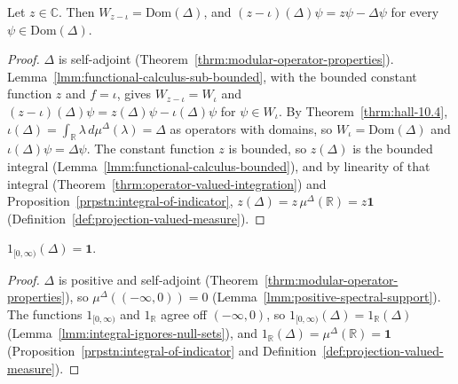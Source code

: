 \begin{lemma}
    \label{lmm:modular-z-minus-fc}
    \leanok
    Let $z \in \mathbb{C}$. Then $W_{z - \iota} = \text{Dom}(\Delta)$, and $(z - \iota)(\Delta)\psi = z\psi - \Delta\psi$ for every $\psi \in \text{Dom}(\Delta)$.
\end{lemma}
\begin{proof}
    \leanok
    $\Delta$ is self-adjoint (Theorem~\ref{thrm:modular-operator-properties}). Lemma~\ref{lmm:functional-calculus-sub-bounded}, with the bounded constant function $z$ and $f = \iota$, gives $W_{z - \iota} = W_\iota$ and $(z - \iota)(\Delta)\psi = z(\Delta)\psi - \iota(\Delta)\psi$ for $\psi \in W_\iota$. By Theorem~\ref{thrm:hall-10.4}, $\iota(\Delta) = \int_{\mathbb{R}} \lambda \, d\mu^\Delta(\lambda) = \Delta$ as operators with domains, so $W_\iota = \text{Dom}(\Delta)$ and $\iota(\Delta)\psi = \Delta\psi$. The constant function $z$ is bounded, so $z(\Delta)$ is the bounded integral (Lemma~\ref{lmm:functional-calculus-bounded}), and by linearity of that integral (Theorem~\ref{thrm:operator-valued-integration}) and Proposition~\ref{prpstn:integral-of-indicator}, $z(\Delta) = z\,\mu^\Delta(\mathbb{R}) = z\mathbf{1}$ (Definition~\ref{def:projection-valued-measure}).
\end{proof}

\begin{lemma}[$1_{[0, \infty)}(\Delta) = \mathbf{1}$]
    \label{lmm:modular-indicator-nonneg-one}
    \leanok
    $1_{[0, \infty)}(\Delta) = \mathbf{1}$.
\end{lemma}
\begin{proof}
    \leanok
    $\Delta$ is positive and self-adjoint (Theorem~\ref{thrm:modular-operator-properties}), so $\mu^\Delta((-\infty, 0)) = 0$ (Lemma~\ref{lmm:positive-spectral-support}). The functions $1_{[0, \infty)}$ and $1_{\mathbb{R}}$ agree off $(-\infty, 0)$, so $1_{[0, \infty)}(\Delta) = 1_{\mathbb{R}}(\Delta)$ (Lemma~\ref{lmm:integral-ignores-null-sets}), and $1_{\mathbb{R}}(\Delta) = \mu^\Delta(\mathbb{R}) = \mathbf{1}$ (Proposition~\ref{prpstn:integral-of-indicator} and Definition~\ref{def:projection-valued-measure}).
\end{proof}

